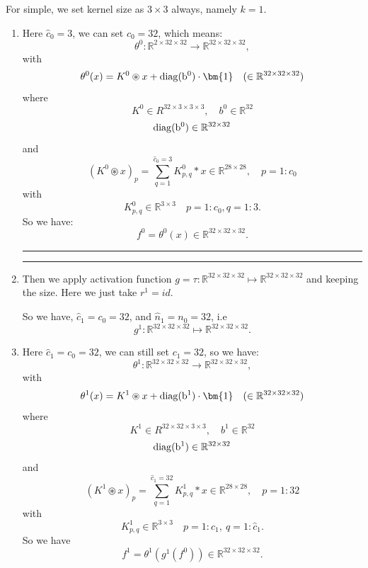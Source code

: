For simple, we set kernel size as $3 \times 3$ always, namely $k=1$.  
\begin{enumerate}
	\bigskip \hrule \bigskip  
	\item Here $\hat c_0 = 3$, we can set $c_0 = 32$, which means:
	\begin{equation}
	\theta^0 : \mathbb R^{2\times 32 \times 32} \to \mathbb R^{32 \times 32 \times32},
	\end{equation}
	with 
	\begin{equation}
	\theta^0(x) = K^0 \circledast x + {\rm{diag}(b^0) }\cdot \bm{1} \quad (\in
	\mathbb R^{32\times 32\times 32})
	\end{equation}
	where 
	$$
	K^0 \in R^{32 \times 3 \times 3 \times 3}, \quad b^0 \in \mathbb R^{32}
	$$
	$$
	\rm{diag}(b^0) 
	\in \mathbb R^{32\times 32}
	$$
	and 
	\begin{equation}
	(K^0 \circledast x)_p = \sum_{q = 1}^{\hat c_0 = 3} K^0_{p,q}\ast x \in \mathbb R^{28 \times 28}, \quad p = 1:c_0
	\end{equation}
	with 
	$$
	K^0_{p,q} \in \mathbb R^{3 \times 3} \quad p = 1:c_0, q = 1:3 .
	$$
	So we have:
	\begin{equation}
	f^0 = \theta^0( x)  \in \mathbb R^{32 \times 32 \times 32}.
	\end{equation}
	
	\bigskip \hrule \bigskip  
	\bigskip \hrule \bigskip  
	
	\item Then we apply activation function $g = \tau : \mathbb R^{32 \times 32 \times 32} \mapsto \mathbb R^{32 \times 32 \times 32} $ and keeping the size.  Here we just take $r^1 = id$.
	
	So we have, $\hat c_1 = c_0 = 32$, and $\hat n_1 = { n_0} = 32$, i.e
	\begin{equation}
	g^1: \mathbb R^{32 \times 32 \times 32} \mapsto \mathbb R^{32\times 32 \times 32}.
	\end{equation}
	
	\item Here $\hat c_1 = c_0 = 32$, we can still set $c_1 = 32$, so we have:
	\begin{equation}
	\theta^1 : \mathbb R^{32\times 32 \times 32} \to \mathbb R^{32 \times 32 \times32},
	\end{equation}
	with 
	\begin{equation}
	\theta^1(x) = K^1 \circledast x + {\rm{diag}(b^1)} \cdot \bm{1} \quad (\in
	\mathbb R^{32\times 32\times 32})
	\end{equation}
	where 
	$$
	K^1 \in R^{32 \times 32 \times 3 \times 3}, \quad b^1 \in \mathbb R^{32}
	$$
	$$
	\rm{diag}(b^1) 
	\in \mathbb R^{32\times 32}
	$$
	and 
	\begin{equation}
	(K^1 \circledast x)_p = \sum_{q = 1}^{\hat c_1 = 32} K^1_{p,q}\ast x \in \mathbb R^{28 \times 28}, \quad p = 1:32
	\end{equation}
	with 
	$$
	K^1_{p,q} \in \mathbb R^{3 \times 3} \quad p = 1: c_1, ~  q = 1: \hat c_1 .
	$$
	So we have 
	\begin{equation}
	f^1 = \theta^1( g^1(f^0))  \in \mathbb R^{32 \times 32 \times 32}.
	\end{equation}
	

\end{enumerate}

